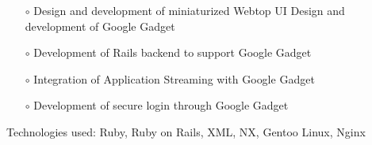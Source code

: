 \documentclass{scrartcl}
\begin{document}
\begin{cv}{
\href{http://www.develmj.com}{}
}
{\begin{itemize}
\begin{itemize}
    \item[\footnotesize$\circ$] Design and development of miniaturized Webtop UI
    Design and development of Google Gadget
    \item[\footnotesize$\circ$] Development of Rails backend to support Google Gadget
    \item[\footnotesize$\circ$] Integration of Application Streaming with Google Gadget
    \item[\footnotesize$\circ$] Development of secure login through
      Google Gadget
    \end{itemize}
    Technologies used: Ruby, Ruby on Rails, XML, NX, Gentoo Linux,
    Nginx
\end{itemize}
}

\vspace{0.5em}


\end{cv}
\end{document}
